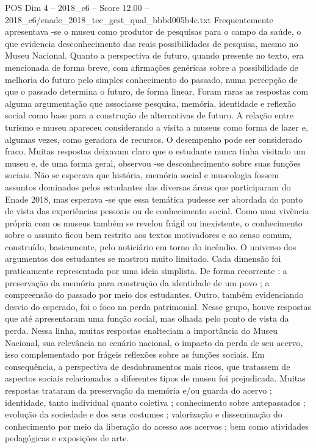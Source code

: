 \begin{textsample}{POS Dim 4 – 2018\_c6 – Score 12.00 – 2018\_c6/enade\_2018\_tec\_gest\_qual\_bbbd005b4c.txt}
Frequentemente apresentava -se o museu como produtor de pesquisas para o campo da saúde, o que evidencia desconhecimento das reais possibilidades de pesquisa, mesmo no Museu Nacional.
Quanto a perspectiva de futuro, quando presente no texto, era mencionada de forma breve, com afirmações genéricas sobre a possibilidade de melhoria do futuro pelo simples conhecimento do passado, numa percepção de que o passado determina o futuro, de forma linear.
Foram raras as respostas com alguma argumentação que associasse pesquisa, memória, identidade e reflexão social como base para a construção de alternativas de futuro.
A relação entre turismo e museu apareceu considerando a visita a museus como forma de lazer e, algumas vezes, como geradora de recursos.
O desempenho pode ser considerado fraco.
Muitas respostas deixavam claro que o estudante nunca tinha visitado um museu e, de uma forma geral, observou -se desconhecimento sobre suas funções sociais.
Não se esperava que história, memória social e museologia fossem assuntos dominados pelos estudantes das diversas áreas que participaram do Enade 2018, mas esperava -se que essa temática pudesse ser abordada do ponto de vista das experiências pessoais ou de conhecimento social.
Como uma vivência própria com os museus também se revelou frágil ou inexistente, o conhecimento sobre o assunto ficou bem restrito aos textos motivadores e ao senso comum, construído, basicamente, pelo noticiário em torno do incêndio.
O universo dos argumentos dos estudantes se mostrou muito limitado.
Cada dimensão foi praticamente representada por uma ideia simplista.
De forma recorrente : a preservação da memória para construção da identidade de um povo ; a compreensão do passado por meio dos estudantes.
Outro, também evidenciando desvio do esperado, foi o foco na perda patrimonial.
Nesse grupo, houve respostas que até apresentaram uma função social, mas olhada pelo ponto de vista da perda.
Nessa linha, muitas respostas enalteciam a importância do Museu Nacional, sua relevância no cenário nacional, o impacto da perda de seu acervo, isso complementado por frágeis reflexões sobre as funções sociais.
Em consequência, a perspectiva de desdobramentos mais ricos, que tratassem de aspectos sociais relacionados a diferentes tipos de museu foi prejudicada.
Muitas respostas trataram da preservação da memória e/ou guarda do acervo ; identidade, tanto individual quanto coletiva ; conhecimento sobre antepassados ; evolução da sociedade e dos seus costumes ; valorização e disseminação do conhecimento por meio da liberação do acesso aos acervos ; bem como atividades pedagógicas e exposições de arte.

\end{textsample}
